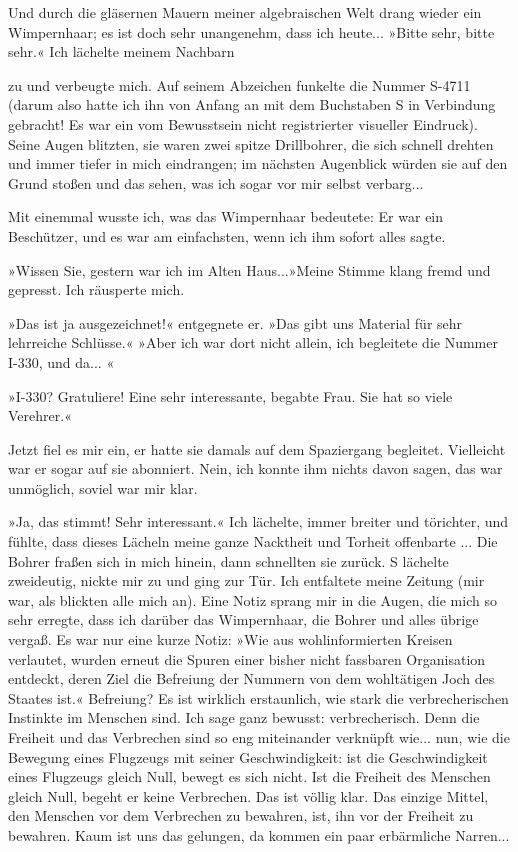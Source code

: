 Und durch die gläsernen Mauern meiner algebraischen Welt drang
wieder ein Wimpernhaar; es ist doch sehr unangenehm, dass ich
heute... »Bitte sehr, bitte sehr.« Ich lächelte meinem Nachbarn

zu und verbeugte mich. Auf seinem Abzeichen funkelte die Nummer
S-4711 (darum also hatte ich ihn von Anfang an mit dem Buchstaben S
in Verbindung gebracht! Es war ein vom Bewusstsein nicht
registrierter visueller Eindruck). Seine Augen blitzten, sie waren
zwei spitze Drillbohrer, die sich schnell drehten und immer tiefer
in mich eindrangen; im nächsten Augenblick würden sie auf den Grund
stoßen und das sehen, was ich sogar vor mir selbst verbarg...

Mit einemmal wusste ich, was das Wimpernhaar bedeutete: Er war ein
Beschützer, und es war am einfachsten, wenn ich ihm sofort alles
sagte.

»Wissen Sie, gestern war ich im Alten Haus...»Meine Stimme klang
fremd und gepresst. Ich räusperte mich.

»Das ist ja ausgezeichnet!« entgegnete er. »Das gibt uns Material
für sehr lehrreiche Schlüsse.« »Aber ich war dort nicht allein, ich
begleitete die Nummer I-330, und da... «

»I-330? Gratuliere! Eine sehr interessante, begabte Frau. Sie hat
so viele Verehrer.«

Jetzt fiel es mir ein, er hatte sie damals auf dem Spaziergang
begleitet. Vielleicht war er sogar auf sie abonniert. Nein, ich
konnte ihm nichts davon sagen, das war unmöglich, soviel war mir
klar.

»Ja, das stimmt! Sehr interessant.« Ich lächelte, immer breiter und
törichter, und fühlte, dass dieses Lächeln meine ganze Nacktheit
und Torheit offenbarte ... Die Bohrer fraßen sich in mich hinein,
dann schnellten sie zurück. S lächelte zweideutig, nickte mir zu
und ging zur Tür. Ich entfaltete meine Zeitung (mir war, als
blickten alle mich an). Eine Notiz sprang mir in die Augen, die
mich so sehr erregte, dass ich darüber das Wimpernhaar, die Bohrer
und alles übrige vergaß. Es war nur eine kurze Notiz: »Wie aus
wohlinformierten Kreisen verlautet, wurden erneut die Spuren einer
bisher nicht fassbaren Organisation entdeckt, deren Ziel die
Befreiung der Nummern von dem wohltätigen Joch des Staates ist.«
Befreiung? Es ist wirklich erstaunlich, wie stark die
verbrecherischen Instinkte im Menschen sind. Ich sage ganz bewusst:
verbrecherisch. Denn die Freiheit und das Verbrechen sind so eng
miteinander verknüpft wie... nun, wie die Bewegung eines Flugzeugs
mit seiner Geschwindigkeit: ist die Geschwindigkeit eines Flugzeugs
gleich Null, bewegt es sich nicht. Ist die Freiheit des Menschen
gleich Null, begeht er keine Verbrechen. Das ist völlig klar. Das
einzige Mittel, den Menschen vor dem Verbrechen zu bewahren, ist,
ihn vor der Freiheit zu bewahren. Kaum ist uns das gelungen, da
kommen ein paar erbärmliche Narren...

